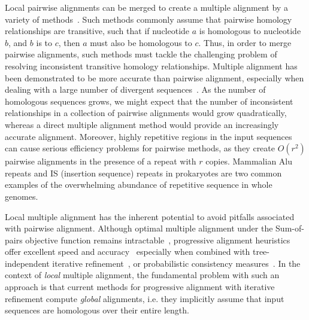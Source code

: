 \documentclass[12pt,journal,letterpaper,onecolumn, draftcls]{IEEEtran}
\begin{document}
Local pairwise alignments can be merged to create a multiple alignment by a variety of
methods~\cite{ref-tba,ref-dialign,ref-related1}. Such methods commonly assume that pairwise homology relationships are transitive, such that if nucleotide $a$ is homologous to nucleotide $b$, and $b$ is to $c$, then $a$ must also be homologous to $c$.  Thus, in order to merge pairwise alignments, such methods must tackle the challenging problem of resolving inconsistent transitive homology relationships.
Multiple alignment has been demonstrated to be more accurate than pairwise alignment, especially when dealing with a large number of divergent sequences~\cite{ref-mlagan,ref-aubergene}.  As the number of homologous sequences grows, we might expect that the number of inconsistent relationships in a collection of pairwise alignments would grow quadratically, whereas a direct multiple alignment method would provide an increasingly accurate alignment.  Moreover, highly repetitive regions in the input sequences can cause serious efficiency
problems for pairwise methods, as they create $O(r^{2})$ pairwise alignments in the presence of a repeat with $r$ copies.  Mammalian Alu repeats and IS (insertion sequence) repeats in prokaryotes are two common examples of the overwhelming abundance of repetitive sequence in whole genomes.

Local multiple alignment has the inherent potential to avoid pitfalls associated with pairwise alignment. Although optimal multiple alignment under the Sum-of-pairs objective function remains intractable~\cite{ref-wangjiang}, progressive alignment heuristics offer excellent speed and accuracy~\cite{ref-clustalw,ref-tcoffee} especially when combined with tree-independent iterative
refinement~\cite{ref-muscle}, or probabilistic consistency measures~\cite{ref-probcons}. In the context of \textit{local}
multiple alignment, the fundamental problem with such an approach is
that current methods for progressive alignment with iterative
refinement compute \textit{global} alignments, i.e. they implicitly
assume that input sequences are homologous over their entire length.
\end{document}
